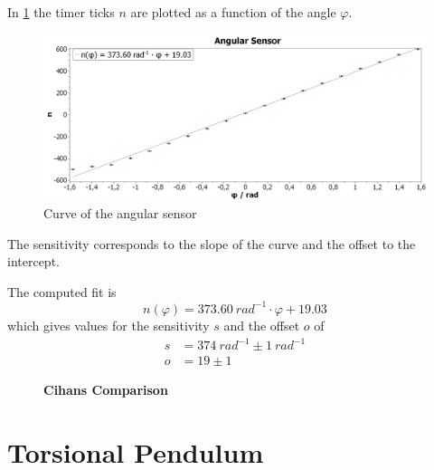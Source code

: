         In \cref{fig:angular-sensor} the timer ticks \(n\) are plotted as a function of the angle \(\varphi\).
        \begin{figure}[H]
            \centering
            \includegraphics[width=1\linewidth]{"messdaten/Angular Sensor"}
            \caption[Curve of the angular sensor]{Curve of the angular sensor}
            \label{fig:angular-sensor}
        \end{figure}
        The sensitivity corresponds to the slope of the curve and the offset to the intercept.\par
        The computed fit is
        \begin{equation}
            n(\varphi)=\SI{373.60}{rad^{-1}}\cdot\varphi +19.03
        \end{equation}
        which gives values for the sensitivity \( s \) and the offset \( o \) of
        \begin{align}
            s&=\SI{374}{rad^{-1}} \pm \SI{1}{rad^{-1}}\\
            o&=19 \pm 1
        \end{align}
        \begin{figure}
            \centering
            \begin{framed}
                \textbf{Cihans Comparison}
            \end{framed}
        \end{figure}

    \section{Torsional Pendulum}
